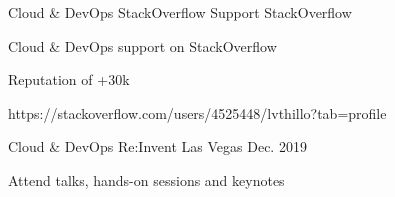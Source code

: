 \begin{cventries}
  \cventry
    {Cloud \& DevOps} %
    {StackOverflow Support} %
    {StackOverflow} %
    {} %
    {
      \begin{cvitems} %
        \item {Cloud \& DevOps support on StackOverflow}
        \item {Reputation of +30k}
        \item {https://stackoverflow.com/users/4525448/lvthillo?tab=profile}
      \end{cvitems}
    }

  \cventry
    {Cloud \& DevOps} %
    {Re:Invent} %
    {Las Vegas} %
    {Dec. 2019} %
    {
      \begin{cvitems} %
        \item {Attend talks, hands-on sessions and keynotes}
      \end{cvitems}
    }

\end{cventries}
